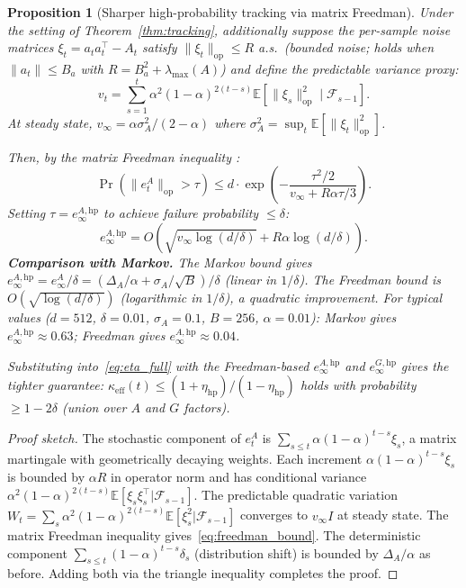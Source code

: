\documentclass{article}
\providecommand{\E}{\mathbb{E}}
\providecommand{\norm}[1]{\lVert #1 \rVert}
\theoremstyle{plain}
\newtheorem{proposition}{Proposition}
\theoremstyle{definition}
\theoremstyle{remark}
\begin{document}
\begin{proposition}[Sharper high-probability tracking via matrix Freedman]
\label{prop:freedman_tracking}
Under the setting of Theorem~\ref{thm:tracking}, additionally suppose the per-sample noise matrices $\xi_t = a_t a_t^\top - A_t$ satisfy $\norm{\xi_t}_{\mathrm{op}} \leq R$ a.s.\ (bounded noise; holds when $\norm{a_t} \leq B_a$ with $R = B_a^2 + \lambda_{\max}(A)$) and define the \emph{predictable variance proxy}:
\begin{equation}
    v_t = \sum_{s=1}^t \alpha^2(1-\alpha)^{2(t-s)}\E[\norm{\xi_s}_{\mathrm{op}}^2 \mid \mathcal{F}_{s-1}].
\end{equation}
At steady state, $v_\infty = \alpha \sigma_A^2/(2-\alpha)$ where $\sigma_A^2 = \sup_t \E[\norm{\xi_t}_{\mathrm{op}}^2]$.

Then, by the matrix Freedman inequality \citep{tropp2011freedman}:
\begin{equation}
\label{eq:freedman_bound}
    \Pr\!\left(\norm{e_t^A}_{\mathrm{op}} > \tau\right) \leq d \cdot \exp\!\left(-\frac{\tau^2/2}{v_\infty + R\alpha\tau/3}\right).
\end{equation}
Setting $\tau = e_\infty^{A,\mathrm{hp}}$ to achieve failure probability $\leq \delta$:
\begin{equation}
    e_\infty^{A,\mathrm{hp}} = O\!\left(\sqrt{v_\infty \log(d/\delta)} + R\alpha\log(d/\delta)\right).
\end{equation}
\textbf{Comparison with Markov.} The Markov bound gives $e_\infty^{A,\mathrm{hp}} = e_\infty^A/\delta = (\Delta_A/\alpha + \sigma_A/\sqrt{B})/\delta$ (linear in $1/\delta$). The Freedman bound is $O(\sqrt{\log(d/\delta)})$ (logarithmic in $1/\delta$), a \emph{quadratic} improvement. For typical values ($d = 512$, $\delta = 0.01$, $\sigma_A = 0.1$, $B = 256$, $\alpha = 0.01$): Markov gives $e_\infty^{A,\mathrm{hp}} \approx 0.63$; Freedman gives $e_\infty^{A,\mathrm{hp}} \approx 0.04$.

Substituting into~\eqref{eq:eta_full} with the Freedman-based $e_\infty^{A,\mathrm{hp}}$ and $e_\infty^{G,\mathrm{hp}}$ gives the tighter guarantee: $\kappa_{\mathrm{eff}}(t) \leq (1+\eta_{\mathrm{hp}})/(1-\eta_{\mathrm{hp}})$ holds with probability $\geq 1 - 2\delta$ (union over $A$ and $G$ factors).
\end{proposition}

\begin{proof}[Proof sketch]
The stochastic component of $e_t^A$ is $\sum_{s \leq t} \alpha(1-\alpha)^{t-s}\xi_s$, a matrix martingale with geometrically decaying weights. Each increment $\alpha(1-\alpha)^{t-s}\xi_s$ is bounded by $\alpha R$ in operator norm and has conditional variance $\alpha^2(1-\alpha)^{2(t-s)}\E[\xi_s \xi_s^\top | \mathcal{F}_{s-1}]$. The predictable quadratic variation $W_t = \sum_s \alpha^2(1-\alpha)^{2(t-s)}\E[\xi_s^2 | \mathcal{F}_{s-1}]$ converges to $v_\infty I$ at steady state. The matrix Freedman inequality \citep{tropp2011freedman} gives~\eqref{eq:freedman_bound}. The deterministic component $\sum_{s \leq t}(1-\alpha)^{t-s}\delta_s$ (distribution shift) is bounded by $\Delta_A/\alpha$ as before. Adding both via the triangle inequality completes the proof.
\end{proof}
\end{document}
